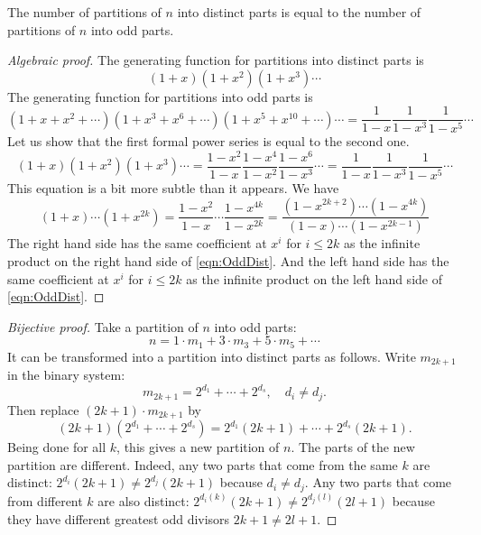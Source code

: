 \begin{page}
\setcounter{section}{3}
\setcounter{subsection}{5}
\setcounter{dfn}{11}
\label{portion:816}

\begin{thm}
The number of partitions of $n$ into distinct parts is equal to the number of partitions of $n$ into odd parts.
\end{thm}

\end{page}

\begin{page}
\setcounter{section}{3}
\setcounter{subsection}{5}
\setcounter{dfn}{11}
\label{portion:817}

\begin{proof}[Algebraic proof]
The generating function for partitions into distinct parts is
\[
(1+x)(1+x^2)(1+x^3)\cdots
\]
The generating function for partitions into odd parts is
\[
(1+x+x^2+\cdots)(1+x^3+x^6+\cdots)(1+x^5+x^{10}+\cdots)\cdots = \frac1{1-x} \frac1{1-x^3} \frac1{1-x^5} \cdots
\]
Let us show that the first formal power series is equal to the second one.
\begin{equation}
\label{eqn:OddDist}
(1+x)(1+x^2)(1+x^3)\cdots = \frac{1-x^2}{1-x} \frac{1-x^4}{1-x^2} \frac{1-x^6}{1-x^3} \cdots = \frac1{1-x} \frac1{1-x^3} \frac1{1-x^5} \cdots
\end{equation}
This equation is a bit more subtle than it appears.
We have
\[
(1+x) \cdots (1+x^{2k}) = \frac{1-x^2}{1-x} \cdots \frac{1-x^{4k}}{1-x^{2k}} = \frac{(1-x^{2k+2}) \cdots (1-x^{4k})}{(1-x) \cdots (1-x^{2k-1})}
\]
The right hand side has the same coefficient at $x^i$ for $i \le 2k$ as the infinite product on the right hand side of \eqref{eqn:OddDist}.
And the left hand side has the same coefficient at $x^i$ for $i \le 2k$ as the infinite product on the left hand side of \eqref{eqn:OddDist}.
\end{proof}

\begin{proof}[Bijective proof]
Take a partition of $n$ into odd parts:
\[
n = 1 \cdot m_1 + 3 \cdot m_3 + 5 \cdot m_5 + \cdots
\]
It can be transformed into a partition into distinct parts as follows.
Write $m_{2k+1}$ in the binary system:
\[
m_{2k+1} = 2^{d_1} + \cdots + 2^{d_s}, \quad d_i \ne d_j.
\]
Then replace $(2k+1) \cdot m_{2k+1}$ by
\[
(2k+1)(2^{d_1} + \cdots + 2^{d_s}) = 2^{d_1}(2k+1) + \cdots + 2^{d_s}(2k+1).
\]
Being done for all $k$, this gives a new partition of $n$.
The parts of the new partition are different.
Indeed, any two parts that come from the same $k$ are distinct: $2^{d_i}(2k+1) \ne 2^{d_j}(2k+1)$ because $d_i \ne d_j$.
Any two parts that come from different $k$ are also distinct: $2^{d_i(k)}(2k+1) \ne 2^{d_j(l)}(2l+1)$
because they have different greatest odd divisors $2k+1 \ne 2l+1$.


\end{proof}
\end{page}
